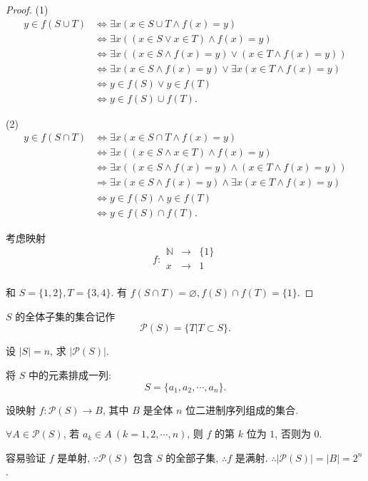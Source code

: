 \documentclass{ctexart}
\begin{document}
\begin{proof}
    (1)
    \begin{align*}
        y\in f(S\cup T) & \Leftrightarrow\exists x(x\in S\cup T\land f(x)=y) \\
        & \Leftrightarrow\exists x((x\in S\vee x\in T)\land f(x)=y) \\
        & \Leftrightarrow\exists x((x\in S\land f(x)=y)\vee(x\in T\land f(x)=y)) \\
        & \Leftrightarrow\exists x(x\in S\land f(x)=y)\vee\exists x(x\in T\land f(x)=y) \\
        & \Leftrightarrow y\in f(S)\vee y\in f(T) \\
        & \Leftrightarrow y\in f(S)\cup f(T).
    \end{align*}

    (2)
    \begin{align*}
        y\in f(S\cap T) & \Leftrightarrow\exists x(x\in S\cap T\land f(x)=y) \\
        & \Leftrightarrow\exists x((x\in S\land x\in T)\land f(x)=y) \\
        & \Leftrightarrow\exists x((x\in S\land f(x)=y)\land(x\in T\land f(x)=y)) \\
        & \Rightarrow\exists x(x\in S\land f(x)=y)\land\exists x(x\in T\land f(x)=y) \\
        & \Leftrightarrow y\in f(S)\land y\in f(T) \\
        & \Leftrightarrow y\in f(S)\cap f(T).
    \end{align*}

    考虑映射
    \[f:\begin{array}{rcl}
        \mathbb{N} & \to & \{1\} \\
        x & \to & 1 \\
    \end{array}\]

    和 $S=\{1,2\},T=\{3,4\}$. 有 $f(S\cap T)=\varnothing,f(S)\cap f(T)=\{1\}$.
\end{proof}
\begin{exercise}%
    $S$ 的全体子集的集合记作
    \[\mathcal{P}(S)=\{T|T\subset S\}.\]

    设 $|S|=n$, 求 $|\mathcal{P}(S)|$.
\end{exercise}
\begin{solution}
    将 $S$ 中的元素排成一列:
    \[S=\{a_1,a_2,\cdots,a_n\}.\]

    设映射 $f:\mathcal{P}(S)\to B$, 其中 $B$ 是全体 $n$ 位二进制序列组成的集合.

    $\forall A\in\mathcal{P}(S)$, 若 $a_k\in A\ (k=1,2,\cdots,n)$, 则 $f$ 的第 $k$ 位为 $1$, 否则为 $0$.

    容易验证 $f$ 是单射, $\because\mathcal{P}(S)$ 包含 $S$ 的全部子集, $\therefore f$ 是满射. $\therefore|\mathcal{P}(S)|=|B|=2^n$.
\end{solution}
\end{document}
